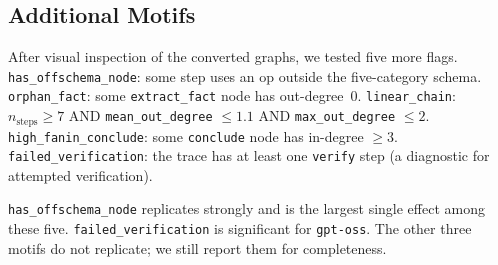 \documentclass[letterpaper]{article}
\begin{document}
\subsection{Additional Motifs}

After visual inspection of the converted graphs, we tested five more flags.
\texttt{has\_offschema\_node}: some step uses an op outside the five-category
schema.
\texttt{orphan\_fact}: some \texttt{extract\_fact} node has out-degree~0.
\texttt{linear\_chain}: $n_{\text{steps}} \geq 7$ AND
\texttt{mean\_out\_degree} $\leq 1.1$ AND \texttt{max\_out\_degree} $\leq 2$.
\texttt{high\_fanin\_conclude}: some \texttt{conclude} node has in-degree
$\geq 3$.
\texttt{failed\_verification}: the trace has at least one \texttt{verify}
step (a diagnostic for attempted verification).

\begin{table}[t]
\centering
\small
{}
\caption{Additional motif results for both models.}
\label{tab:appendix-additional}
\end{table}

\noindent \texttt{has\_offschema\_node} replicates strongly and is the largest
single effect among these five.
\texttt{failed\_verification} is significant for \texttt{gpt-oss}.
The other three motifs do not replicate; we still report them for completeness.
\end{document}
